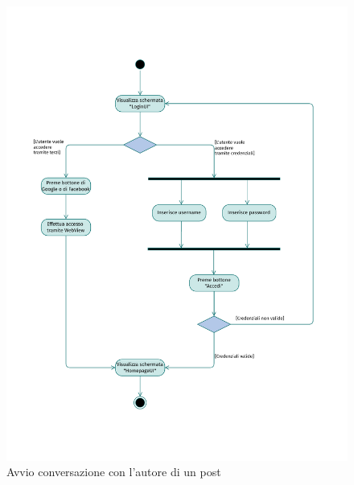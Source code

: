 \documentclass{natourDoc}
\begin{document}
\newpage
\begin{figure}[!htbp]
	\centering
	\includegraphics[width=\textwidth, page=14]{./diagrams/activity.pdf}
	\caption{Avvio conversazione con l'autore di un post}
\end{figure}
\FloatBarrier
\end{document}
